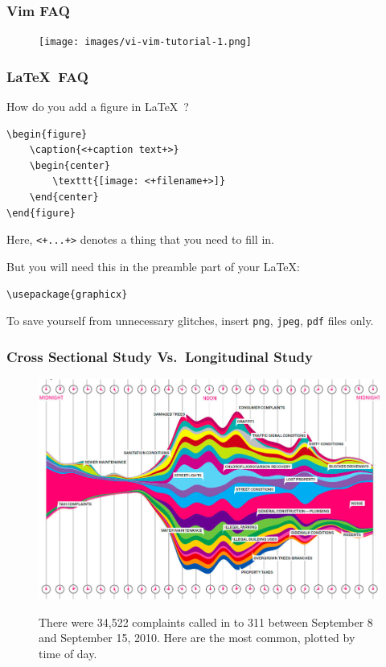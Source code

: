 \documentclass[hyperref={colorlinks=false},handout,10pt]{beamer}
\def\LaTeXs{\LaTeX\ }
\begin{document}
\begin{frame}
    \frametitle{Vim FAQ}
    \begin{figure}
        \begin{center}
            \texttt{[image: images/vi-vim-tutorial-1.png]}
        \end{center}
    \end{figure}
\end{frame}

\begin{frame}[fragile]
    \frametitle{\LaTeXs FAQ}
    \begin{block}{How do you add a figure in \LaTeXs?}
    \begin{lstlisting}
\begin{figure}
    \caption{<+caption text+>}
    \begin{center}
        \texttt{[image: <+filename+>]}
    \end{center}
\end{figure}
    \end{lstlisting}
     Here, \verb$<+...+>$ denotes a thing that you need to fill in.
    \end{block}
    \begin{block}{But you will need this in the preamble part of your \LaTeX:}
    \begin{lstlisting}
\usepackage{graphicx} 
    \end{lstlisting}
    To save yourself from unnecessary glitches, insert \texttt{png},
    \texttt{jpeg}, \texttt{pdf} files only.
    \end{block}
\end{frame}

\begin{frame}
    \frametitle{Cross Sectional Study Vs.\ Longitudinal Study}
    \begin{figure}
        \centering
            \href{http://www.wired.com/magazine/2010/11/ff_311_new_york/all/}{ \includegraphics[scale=0.3]{images/311callvolume.png}}
            \caption{There were 34,522 complaints called in to 311 between September 8 and September 15, 2010. Here are the most common, plotted by time of day.}
    \end{figure}
\end{frame}
\end{document}
